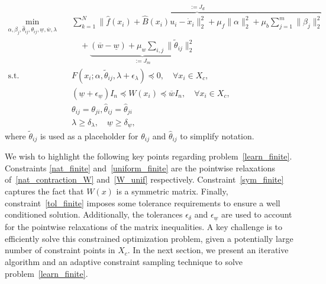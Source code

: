 \documentclass[conference]{svproc}
\newcommand{\wl}{\underline{w}}
\newcommand{\wu}{\overline{w}}
\newcommand{\xs}{x_i}
\begin{document}
\begin{leftbox}
\begin{itemize}[leftmargin=0.4in]
\begin{subequations}
\begin{align}
    \min_{\alpha,\beta_j, \hat{\theta}_{ij}, \theta_{ij}, \wl, \wu,\lambda} \quad &  \overbrace{\sum_{k=1}^{N} \| \hat{f}(\xs)+\hat{B}(\xs)u_i - \dot{x}_i \|_2^2 + \mu_f \|\alpha\|_2^2 + \mu_b \sum_{j=1}^{m} \|\beta_j\|_2^2}^{:=J_d}  \nonumber \\
    \quad & \quad + \underbrace{(\wu-\wl) +  \mu_w\sum_{i,j} \|\tilde{\theta}_{ij}\|_2^2}_{:=J_m}  \\
    \text{s.t.} \quad & F(\xs;\alpha,\tilde{\theta}_{ij}, \lambda + \epsilon_{\lambda}) \preceq 0, \quad \forall \xs \in X_c, \label{nat_finite} \\
    \quad & (\wl + \epsilon_{\wl})I_{n} \preceq W(\xs) \preceq \wu I_n, \quad \forall \xs \in X_c, \label{uniform_finite} \\
    \quad & \theta_{ij} = \theta_{ji},  \hat{\theta}_{ij} = \hat{\theta}_{ji} \label{sym_finite} \\
    \quad &\lambda \geq \delta_{\lambda}, \quad  \wl \geq \delta_{\wl}, \label{tol_finite}
\end{align}
\end{subequations}
where $\tilde{\theta}_{ij}$ is used as a placeholder for $\theta_{ij}$ and $\hat{\theta}_{ij}$ to simplify notation.
\end{itemize}
\end{leftbox}

We wish to highlight the following key points regarding problem~\eqref{learn_finite}. 
Constraints \eqref{nat_finite} and~\eqref{uniform_finite} are the pointwise relaxations of~\eqref{nat_contraction_W} and~\eqref{W_unif} respectively. Constraint~\eqref{sym_finite} captures the fact that $W(x)$ is a symmetric matrix. Finally, constraint~\eqref{tol_finite} imposes some tolerance requirements to ensure a well conditioned solution. Additionally, the tolerances $\epsilon_{\delta}$ and $\epsilon_{\wl}$ are used to account for the pointwise relaxations of the matrix inequalities. A key challenge is to efficiently solve this constrained optimization problem, given a potentially large number of constraint points in $X_c$. In the next section, we present an iterative algorithm and an adaptive constraint sampling technique to solve problem~\eqref{learn_finite}.



\end{document}

